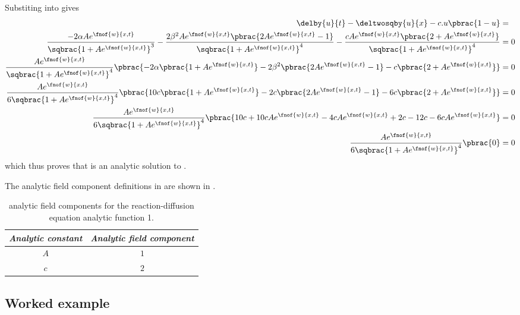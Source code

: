 Substiting
into  gives
\begin{align}
  \delby{u}{t}-\deltwosqby{u}{x}-c.u\pbrac{1-u}&= \\
  \dfrac{-2\alpha A e^{\fnof{w}{x,t}}}{\sqbrac{1+A e^{\fnof{w}{x,t}}}^{3}}-
  \dfrac{2\beta^{2}A e^{\fnof{w}{x,t}}\pbrac{2A e^{\fnof{w}{x,t}}-1}}{\sqbrac{1+A e^{\fnof{w}{x,t}}}^{4}}
  -\dfrac{cA e^{\fnof{w}{x,t}}\pbrac{2+A e^{\fnof{w}{x,t}}}}{\sqbrac{1+A e^{\fnof{w}{x,t}}}^{4}}&=0\\
  \dfrac{A e^{\fnof{w}{x,t}}}{\sqbrac{1+A e^{\fnof{w}{x,t}}}^{4}}\pbrac{-2\alpha\pbrac{1+A e^{\fnof{w}{x,t}}}-
    2\beta^{2}\pbrac{2A e^{\fnof{w}{x,t}}-1}-c\pbrac{2+A e^{\fnof{w}{x,t}}}}&=0\\
  \dfrac{A e^{\fnof{w}{x,t}}}{6\sqbrac{1+A e^{\fnof{w}{x,t}}}^{4}}\pbrac{10 c\pbrac{1+A e^{\fnof{w}{x,t}}}-
    2c\pbrac{2A e^{\fnof{w}{x,t}}-1}-6c\pbrac{2+A e^{\fnof{w}{x,t}}}}&=0\\
  \dfrac{A e^{\fnof{w}{x,t}}}{6\sqbrac{1+A e^{\fnof{w}{x,t}}}^{4}}\pbrac{10 c+10 cA e^{\fnof{w}{x,t}}-
    4cA e^{\fnof{w}{x,t}}+2c-12c-6cA e^{\fnof{w}{x,t}}}&=0\\
  \dfrac{A e^{\fnof{w}{x,t}}}{6\sqbrac{1+A e^{\fnof{w}{x,t}}}^{4}}\pbrac{0}&=0
\end{align}
which thus proves that  is an analytic solution to .

The analytic field component definitions in \OpenCMISS are shown in .

\begin{table}[htb] \centering
  \begin{tabular}{|c|c|} \hline
    \emph{Analytic constant} & \emph{Analytic field component} \\ \hline \hline
    $A$ & $1$ \\ 
    $c$ & $2$ \\ \hline
  \end{tabular}
  \caption{\OpenCMISS analytic field components for the \oned reaction-diffusion equation
    analytic function 1.}
  \label{tab:OpenCMISSAnalyticFieldReactionDiffusionOneDim1}
\end{table}


\subsection{Worked example}
\label{subsec:ReactionDiffusionWorkedExample}

